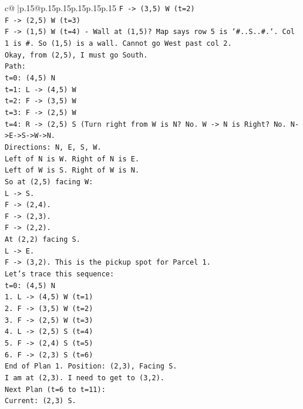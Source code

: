 \documentclass{article}
\begin{document}
{\begin{supertabular}{c@{$\;$}|p{.15\linewidth}@{}p{.15\linewidth}p{.15\linewidth}p{.15\linewidth}p{.15\linewidth}p{.15\linewidth}}
{{{\texttt{F {-}> (3,5) W (t=2)} \\
\texttt{F {-}> (2,5) W (t=3)} \\
\texttt{F {-}> (1,5) W (t=4) {-} Wall at (1,5)? Map says row 5 is `\#..S..\#.`. Col 1 is \#. So (1,5) is a wall. Cannot go West past col 2.} \\
\texttt{Okay, from (2,5), I must go South.} \\
\texttt{Path:} \\
\texttt{t=0: (4,5) N} \\
\texttt{t=1: L {-}> (4,5) W} \\
\texttt{t=2: F {-}> (3,5) W} \\
\texttt{t=3: F {-}> (2,5) W} \\
\texttt{t=4: R {-}> (2,5) S (Turn right from W is N? No. W {-}> N is Right? No. N{-}>E{-}>S{-}>W{-}>N.} \\
\texttt{Directions: N, E, S, W.} \\
\texttt{Left of N is W. Right of N is E.} \\
\texttt{Left of W is S. Right of W is N.} \\
\texttt{So at (2,5) facing W:} \\
\texttt{L {-}> S.} \\
\texttt{F {-}> (2,4).} \\
\texttt{F {-}> (2,3).} \\
\texttt{F {-}> (2,2).} \\
\texttt{At (2,2) facing S.} \\
\texttt{L {-}> E.} \\
\texttt{F {-}> (3,2). This is the pickup spot for Parcel 1.} \\
\texttt{Let's trace this sequence:} \\
\texttt{t=0: (4,5) N} \\
\texttt{1. L {-}> (4,5) W (t=1)} \\
\texttt{2. F {-}> (3,5) W (t=2)} \\
\texttt{3. F {-}> (2,5) W (t=3)} \\
\texttt{4. L {-}> (2,5) S (t=4)} \\
\texttt{5. F {-}> (2,4) S (t=5)} \\
\texttt{6. F {-}> (2,3) S (t=6)} \\
\texttt{End of Plan 1. Position: (2,3), Facing S.} \\
\texttt{I am at (2,3). I need to get to (3,2).} \\
\texttt{Next Plan (t=6 to t=11):} \\
\texttt{Current: (2,3) S.} \\
}}}
\end{supertabular}}
\end{document}
